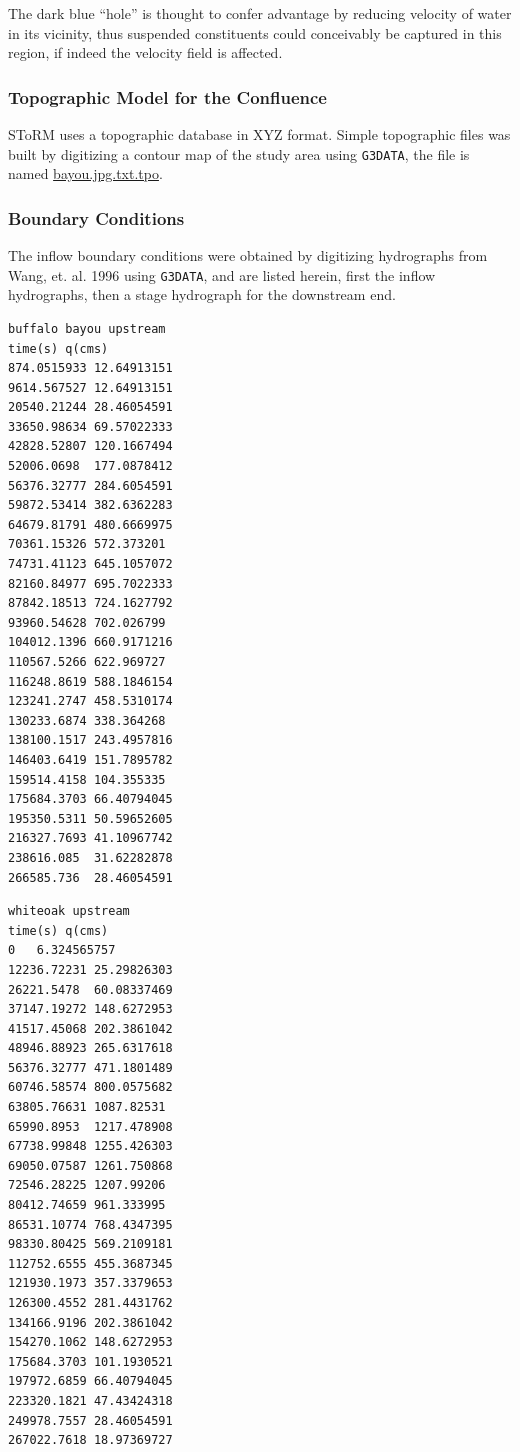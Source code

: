 \documentclass[12pt]{article}
\begin{document}
The dark blue ``hole'' is thought to confer advantage by reducing velocity of water in its vicinity, thus suspended constituents could conceivably be captured in this region, if indeed the velocity field is affected.  

\subsubsection*{Topographic Model for the Confluence}
SToRM uses a topographic database in XYZ format.   Simple topographic files was built by digitizing a contour map of the study area using \texttt{G3DATA}, the file is named \url{bayou.jpg.txt.tpo}.

\subsubsection*{Boundary Conditions}
The inflow boundary conditions were obtained by digitizing hydrographs from Wang, et. al. 1996 using \texttt{G3DATA},
and are listed herein, first the inflow hydrographs, then a stage hydrograph for the downstream end.
\begin{verbatim}
buffalo bayou upstream
time(s)	q(cms)
874.0515933	12.64913151
9614.567527	12.64913151
20540.21244	28.46054591
33650.98634	69.57022333
42828.52807	120.1667494
52006.0698	177.0878412
56376.32777	284.6054591
59872.53414	382.6362283
64679.81791	480.6669975
70361.15326	572.373201
74731.41123	645.1057072
82160.84977	695.7022333
87842.18513	724.1627792
93960.54628	702.026799
104012.1396	660.9171216
110567.5266	622.969727
116248.8619	588.1846154
123241.2747	458.5310174
130233.6874	338.364268
138100.1517	243.4957816
146403.6419	151.7895782
159514.4158	104.355335
175684.3703	66.40794045
195350.5311	50.59652605
216327.7693	41.10967742
238616.085	31.62282878
266585.736	28.46054591
\end{verbatim}

\begin{verbatim}
whiteoak upstream
time(s)	q(cms)
0	6.324565757
12236.72231	25.29826303
26221.5478	60.08337469
37147.19272	148.6272953
41517.45068	202.3861042
48946.88923	265.6317618
56376.32777	471.1801489
60746.58574	800.0575682
63805.76631	1087.82531
65990.8953	1217.478908
67738.99848	1255.426303
69050.07587	1261.750868
72546.28225	1207.99206
80412.74659	961.333995
86531.10774	768.4347395
98330.80425	569.2109181
112752.6555	455.3687345
121930.1973	357.3379653
126300.4552	281.4431762
134166.9196	202.3861042
154270.1062	148.6272953
175684.3703	101.1930521
197972.6859	66.40794045
223320.1821	47.43424318
249978.7557	28.46054591
267022.7618	18.97369727
\end{verbatim}
\end{document}
